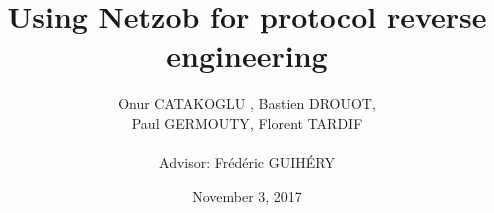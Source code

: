 \documentclass{beamer}
\newcounter{m} %
\newcounter{c} %
\begin{document}



\title{\bf Using Netzob for protocol reverse engineering }   
\author{Onur CATAKOGLU , Bastien DROUOT,\\ Paul GERMOUTY, Florent TARDIF\\~\\ Advisor: Fr\'{e}d\'{e}ric GUIH\'{E}RY} 
\date{November 3, 2017} 



\end{document}
